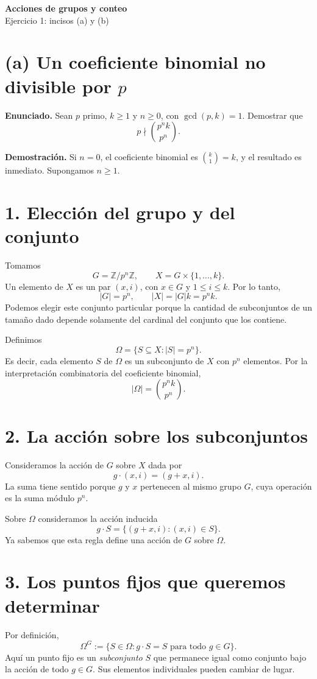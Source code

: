 \documentclass[11pt,a4paper]{article}
\begin{document}
\begin{center}
{\LARGE\bfseries Acciones de grupos y conteo}\\[6pt]
{\large Ejercicio 1: incisos (a) y (b)}
\end{center}
\medskip
\section*{(a) Un coeficiente binomial no divisible por $p$}

\textbf{Enunciado.} Sean $p$ primo, $k\geq1$ y $n\geq0$, con $\gcd(p,k)=1$. Demostrar que
\[
p\nmid\binom{p^nk}{p^n}.
\]

\textbf{Demostración.} Si $n=0$, el coeficiente binomial es $\binom{k}{1}=k$, y el resultado es inmediato. Supongamos $n\geq1$.

\section*{1. Elección del grupo y del conjunto}
Tomamos
\[
G=\mathbb Z/p^n\mathbb Z,\qquad X=G\times\{1,\ldots,k\}.
\]
Un elemento de $X$ es un par $(x,i)$, con $x\in G$ y $1\leq i\leq k$. Por lo tanto,
\[
|G|=p^n,\qquad |X|=|G|k=p^nk.
\]
Podemos elegir este conjunto particular porque la cantidad de subconjuntos de un tamaño dado depende solamente del cardinal del conjunto que los contiene.

Definimos
\[
\Omega=\{S\subseteq X:|S|=p^n\}.
\]
Es decir, cada elemento $S$ de $\Omega$ es un subconjunto de $X$ con $p^n$ elementos. Por la interpretación combinatoria del coeficiente binomial,
\[
\boxed{|\Omega|=\binom{p^nk}{p^n}}.
\]

\section*{2. La acción sobre los subconjuntos}
Consideramos la acción de $G$ sobre $X$ dada por
\[
g\cdot(x,i)=(g+x,i).
\]
La suma tiene sentido porque $g$ y $x$ pertenecen al mismo grupo $G$, cuya operación es la suma módulo $p^n$.

Sobre $\Omega$ consideramos la acción inducida
\[
g\cdot S=\{(g+x,i):(x,i)\in S\}.
\]
Ya sabemos que esta regla define una acción de $G$ sobre $\Omega$.

\newpage
\section*{3. Los puntos fijos que queremos determinar}
Por definición,
\[
\Omega^G:=\{S\in\Omega:g\cdot S=S\text{ para todo }g\in G\}.
\]
Aquí un punto fijo es un \emph{subconjunto} $S$ que permanece igual como conjunto bajo la acción de todo $g\in G$. Sus elementos individuales pueden cambiar de lugar.
\end{document}

